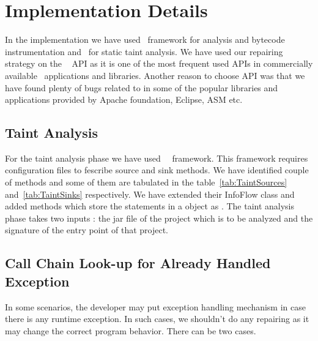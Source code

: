 \section{Implementation Details}
\label{sec:implementation}

In the implementation we have used \soot\ framework for analysis and bytecode 
instrumentation and \infoflow\ for static taint analysis. We have used our
repairing strategy on the \java\  API as it is one of the most
frequent used APIs in commercially available \java\ applications and libraries.
Another reason to choose  API was that we have found plenty of
bugs related to  in some of the popular libraries and applications
provided by Apache foundation, Eclipse, ASM etc.

\subsection{Taint Analysis}

For the taint analysis phase we have used \soot\ \infoflow\ framework. This
framework requires configuration files to fescribe source and sink methods. We
have identified couple of methods and some of them are tabulated in the
table~\ref{tab:TaintSources} and~\ref{tab:TaintSinks} respectively. We have
extended their InfoFlow class and added methods which store the statements in a
 object as . The taint analysis phase takes two inputs :
the jar file of the project which is to be analyzed and the  
signature of the entry point of that project.

\subsection{Call Chain Look-up for Already Handled Exception}
\label{subsec:callChainLookUp}

In some scenarios, the developer may put exception handling mechanism in case
there is any runtime exception. In such cases, we shouldn't do any repairing 
as it may change the correct program behavior. There can be two cases.

